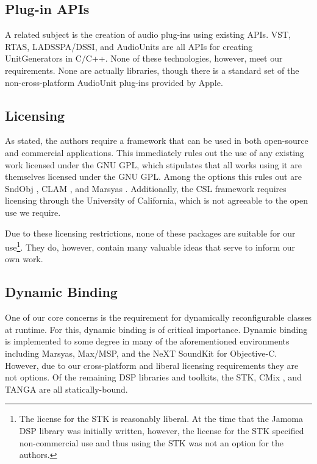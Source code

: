 \documentclass[twoside,10pt]{article}
\begin{document}


\subsection{Plug-in APIs} %

A related subject is the creation of audio plug-ins using existing APIs.  VST, RTAS, LADSSPA/DSSI, and AudioUnits are all APIs for creating UnitGenerators in C/C++.  None of these technologies, however, meet our requirements.  None are actually libraries, though there is a standard set of the non-cross-platform AudioUnit plug-ins provided by Apple.



\subsection{Licensing} %

As stated, the authors require a framework that can be used in both open-source and commercial applications.  This immediately rules out the use of any existing work licensed under the GNU GPL, which stipulates that all works using it are themselves licensed under the GNU GPL.  Among the options this rules out are SndObj \cite{Lazzarini:2001}, CLAM \cite{Amatraian:2008}, and Marsyas \cite{Tzanetakis:2008}.  Additionally, the CSL framework \cite{Pope:2003} requires licensing through the University of California, which is not agreeable to the open use we require.

Due to these licensing restrictions, none of these packages are suitable for our use\footnote{The license for the STK is reasonably liberal.  At the time that the Jamoma DSP library was initially written, however, the license for the STK specified non-commercial use and thus using the STK was not an option for the authors.}.  They do, however, contain many valuable ideas that serve to inform our own work.



\subsection{Dynamic Binding} %

One of our core concerns is the requirement for dynamically reconfigurable classes at runtime.  For this, dynamic binding is of critical importance.  Dynamic binding is implemented to some degree in many of the aforementioned environments including Marsyas, Max/MSP, and the NeXT SoundKit for Objective-C.  However, due to our cross-platform and liberal licensing requirements they are not options.  Of the remaining DSP libraries and toolkits, the STK\cite{Cook:1999}, CMix \cite{Lansky:1990}, and TANGA \cite{Reiter:2007} are all statically-bound.  
\end{document}
